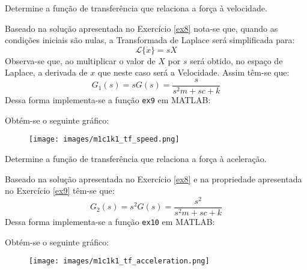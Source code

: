 \documentclass{article}
\begin{document}
\newpage
\begin{exercise}\label{ex9}
    Determine a função de transferência que relaciona a força à velocidade.
\end{exercise}
\begin{resolution}
    Baseado na solução apresentada no Exercício \ref{ex8} nota-se que, quando as condições iniciais são nulas, a Transformada de Laplace será simplificada para:
    \begin{equation}
        \mathcal{L} \lbrace\dot{x}\rbrace = sX 
    \end{equation}
    Observa-se que, ao multiplicar o valor de $X$ por $s$ será obtido, no espaço de Laplace, a derivada de $x$ que neste caso será a Velocidade. Assim têm-se que:
    \begin{equation}
        \boxed{G_{1}(s) = s G(s) = \frac{s}{s^2m + sc + k}}
    \end{equation}
    Dessa forma implementa-se a função \texttt{ex9} em MATLAB:
    \begin{scriptsize}
        \myMatlab
    \end{scriptsize}
    Obtém-se o seguinte gráfico:
    \begin{figure}[H]
        \centering
        \texttt{[image: images/m1c1k1\_tf\_speed.png]}
    \end{figure}
\end{resolution}

\newpage
\begin{exercise}\label{ex10}
    Determine a função de transferência que relaciona a força à aceleração.
\end{exercise}
\begin{resolution}
    Baseado na solução apresentada no Exercício \ref{ex8} e na propriedade apresentada no Exercício \ref{ex9} têm-se que:
    \begin{equation}
        \boxed{G_{2}(s) = s^2 G(s) = \frac{s^2}{s^2m + sc + k}}
    \end{equation}
    Dessa forma implementa-se a função \texttt{ex10} em MATLAB:
    \begin{scriptsize}
        \myMatlab
    \end{scriptsize}
    Obtém-se o seguinte gráfico:
    \begin{figure}[H]
        \centering
        \texttt{[image: images/m1c1k1\_tf\_acceleration.png]}
    \end{figure}
\end{resolution}
\end{document}
